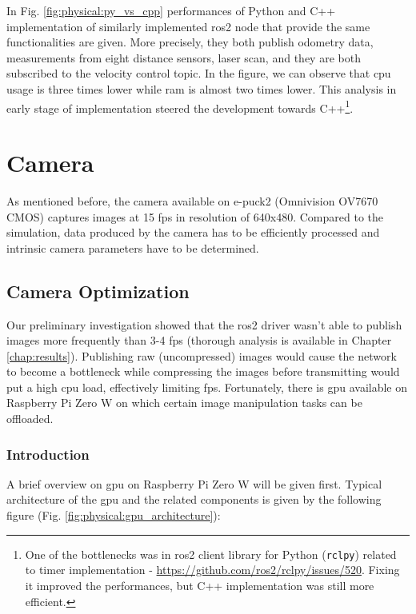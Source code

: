 
In Fig. \ref{fig:physical:py_vs_cpp} performances of Python and C++ implementation of similarly implemented \ac{ros2} node that provide the same functionalities are given.
More precisely, they both publish odometry data, measurements from eight distance sensors, laser scan, and they are both subscribed to the velocity control topic.
In the figure, we can observe that \ac{cpu} usage is three times lower while \ac{ram} is almost two times lower.
This analysis in early stage of implementation steered the development towards C++\footnote{One of the bottlenecks was in \ac{ros2} client library for Python (\texttt{rclpy}) related to timer implementation - \url{https://github.com/ros2/rclpy/issues/520}. Fixing it improved the performances, but C++ implementation was still more efficient.}.

\section{Camera}
As mentioned before, the camera available on e-puck2 (Omnivision OV7670 CMOS) captures images at 15 \acs{fps} in resolution of 640x480.
Compared to the simulation, data produced by the camera has to be efficiently processed and intrinsic camera parameters have to be determined.

\subsection{Camera Optimization}
Our preliminary investigation showed that the \ac{ros2} driver wasn't able to publish images more frequently than 3-4 \acs{fps} (thorough analysis is available in Chapter \ref{chap:results}).
Publishing raw (uncompressed) images would cause the network to become a bottleneck while compressing the images before transmitting would put a high \ac{cpu} load, effectively limiting \ac{fps}.
Fortunately, there is \ac{gpu} available on Raspberry Pi Zero W on which certain image manipulation tasks can be offloaded.

\subsubsection{Introduction}
A brief overview on \ac{gpu} on Raspberry Pi Zero W will be given first. Typical architecture of the \ac{gpu} and the related components is given by the following figure (Fig. \ref{fig:physical:gpu_architecture}):
 
